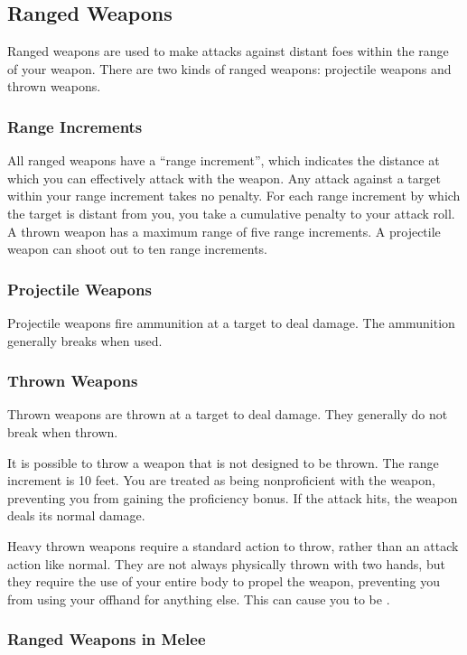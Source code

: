 \subsection{Ranged Weapons}
Ranged weapons are used to make attacks against distant foes within the range of your weapon. There are two kinds of ranged weapons: projectile weapons and thrown weapons.

\subsubsection{Range Increments}\label{Range Increment} All ranged weapons have a ``range increment'', which indicates the distance at which you can effectively attack with the weapon. Any attack against a target within your range increment takes no penalty. For each range increment by which the target is distant from you, you take a cumulative  penalty to your attack roll. A thrown weapon has a maximum range of five range increments. A projectile weapon can shoot out to ten range increments.

\subsubsection{Projectile Weapons} Projectile weapons fire ammunition at a target to deal damage. The ammunition generally breaks when used.

\subsubsection{Thrown Weapons}\label{Thrown Weapons} Thrown weapons are thrown at a target to deal damage. They generally do not break when thrown.

 It is possible to throw a weapon that is not designed to be thrown. The range increment is 10 feet. You are treated as being nonproficient with the weapon, preventing you from gaining the  proficiency bonus. If the attack hits, the weapon deals its normal damage.

 Heavy thrown weapons require a standard action to throw, rather than an attack action like normal. They are not always physically thrown with two hands, but they require the use of your entire body to propel the weapon, preventing you from using your offhand for anything else. This can cause you to be .

\subsubsection{Ranged Weapons in Melee}

